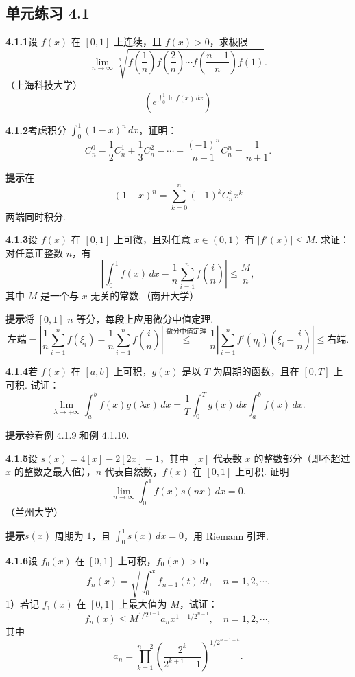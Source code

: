 \documentclass[UTF8,12pt,a4paper,fontset=fandol]{ctexart}
\begin{document}
\subsection*{单元练习 4.1}

\noindent\textbf{4.1.1}\quad 设 $f(x)$ 在 $[0,1]$ 上连续，且 $f(x)>0$，求极限
\[
\lim_{n\to\infty}
\sqrt[n]{f\left(\frac1n\right)f\left(\frac2n\right)\cdots
f\left(\frac{n-1}{n}\right)f(1)}.
\]
（上海科技大学）
\[
\left(e^{\int_0^1\ln f(x)\,dx}\right)
\]

\noindent\textbf{4.1.2}\quad 考虑积分 $\displaystyle\int_0^1(1-x)^n\,dx$，证明：
\[
C_n^0-\frac12C_n^1+\frac13C_n^2-\cdots+\frac{(-1)^n}{n+1}C_n^n
=\frac1{n+1}.
\]

\noindent\textbf{提示}\quad 在
\[
(1-x)^n=\sum_{k=0}^n(-1)^kC_n^kx^k
\]
两端同时积分.

\noindent\textbf{4.1.3}\quad 设 $f(x)$ 在 $[0,1]$ 上可微，且对任意 $x\in(0,1)$ 有 $|f'(x)|\le M$. 求证：对任意正整数 $n$，有
\[
\left|\int_0^1f(x)\,dx-\frac1n\sum_{i=1}^n f\left(\frac in\right)\right|
\le\frac Mn,
\]
其中 $M$ 是一个与 $x$ 无关的常数.（南开大学）

\noindent\textbf{提示}\quad 将 $[0,1]$ $n$ 等分，每段上应用微分中值定理.
\[
\text{左端}
=\left|\frac1n\sum_{i=1}^nf(\xi_i)-\frac1n\sum_{i=1}^nf\left(\frac in\right)\right|
\stackrel{\text{微分中值定理}}{\le}
\frac1n\left|\sum_{i=1}^nf'(\eta_i)\left(\xi_i-\frac in\right)\right|
\le\text{右端}.
\]

\noindent\textbf{4.1.4}\quad 若 $f(x)$ 在 $[a,b]$ 上可积，$g(x)$ 是以 $T$ 为周期的函数，且在 $[0,T]$ 上可积. 试证：
\[
\lim_{\lambda\to+\infty}\int_a^b f(x)g(\lambda x)\,dx
=\frac1T\int_0^Tg(x)\,dx\int_a^bf(x)\,dx.
\]

\noindent\textbf{提示}\quad 参看例 4.1.9 和例 4.1.10.

\noindent\textbf{4.1.5}\quad 设 $s(x)=4[x]-2[2x]+1$，其中 $[x]$ 代表数 $x$ 的整数部分（即不超过 $x$ 的整数之最大值），$n$ 代表自然数，$f(x)$ 在 $[0,1]$ 上可积. 证明
\[
\lim_{n\to\infty}\int_0^1f(x)s(nx)\,dx=0.
\]
（兰州大学）

\noindent\textbf{提示}\quad $s(x)$ 周期为 $1$，且 $\displaystyle\int_0^1s(x)\,dx=0$，用 Riemann 引理.

\noindent\textbf{4.1.6}\quad 设 $f_0(x)$ 在 $[0,1]$ 上可积，$f_0(x)>0$，
\[
f_n(x)=\sqrt{\int_0^x f_{n-1}(t)\,dt},\quad n=1,2,\cdots.
\]
1）若记 $f_1(x)$ 在 $[0,1]$ 上最大值为 $M$，试证：
\[
f_n(x)\le M^{1/2^{n-1}}a_nx^{1-1/2^{n-1}},\quad n=1,2,\cdots,
\]
其中
\[
a_n=\prod_{k=1}^{n-2}
\left(\frac{2^k}{2^{k+1}-1}\right)^{1/2^{n-1-k}}.
\]
\end{document}
